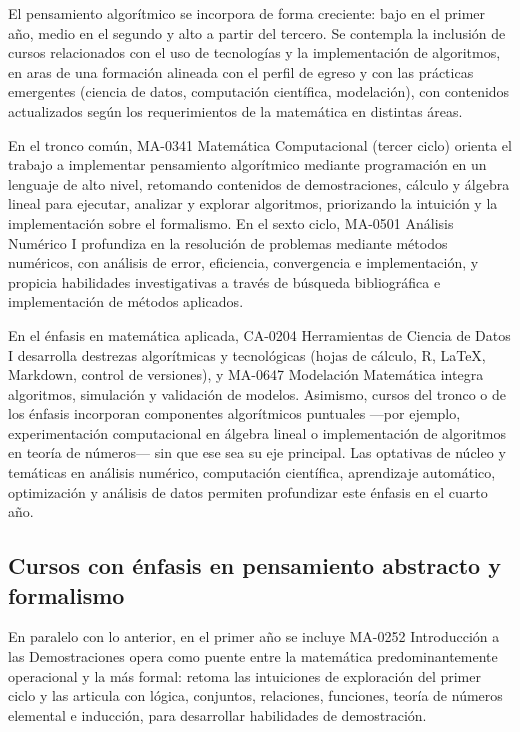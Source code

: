 \begin{refsection}
El pensamiento algorítmico se incorpora de forma creciente: bajo en el primer año, medio en el segundo y alto a partir del tercero. Se contempla la inclusión de cursos relacionados con el uso de tecnologías y la implementación de algoritmos, en aras de una formación alineada con el perfil de egreso y con las prácticas emergentes (ciencia de datos, computación científica, modelación), con contenidos actualizados según los requerimientos de la matemática en distintas áreas.

En el tronco común, MA-0341 Matemática Computacional (tercer ciclo) orienta el trabajo a implementar pensamiento algorítmico mediante programación en un lenguaje de alto nivel, retomando contenidos de demostraciones, cálculo y álgebra lineal para ejecutar, analizar y explorar algoritmos, priorizando la intuición y la implementación sobre el formalismo. En el sexto ciclo, MA-0501 Análisis Numérico I profundiza en la resolución de problemas mediante métodos numéricos, con análisis de error, eficiencia, convergencia e implementación, y propicia habilidades investigativas a través de búsqueda bibliográfica e implementación de métodos aplicados.

En el énfasis en matemática aplicada, CA-0204 Herramientas de Ciencia de Datos I desarrolla destrezas algorítmicas y tecnológicas (hojas de cálculo, R, \LaTeX{}, Markdown, control de versiones), y MA-0647 Modelación Matemática integra algoritmos, simulación y validación de modelos. Asimismo, cursos del tronco o de los énfasis incorporan componentes algorítmicos puntuales ---por ejemplo, experimentación computacional en álgebra lineal o implementación de algoritmos en teoría de números--- sin que ese sea su eje principal. Las optativas de núcleo y temáticas en análisis numérico, computación científica, aprendizaje automático, optimización y análisis de datos permiten profundizar este énfasis en el cuarto año.

\subsection{Cursos con énfasis en pensamiento abstracto y formalismo}

En paralelo con lo anterior, en el primer año se incluye MA-0252 Introducción a las Demostraciones opera como puente entre la matemática predominantemente operacional y la más formal: retoma las intuiciones de exploración del primer ciclo y las articula con lógica, conjuntos, relaciones, funciones, teoría de números elemental e inducción, para desarrollar habilidades de demostración.


\end{refsection}

